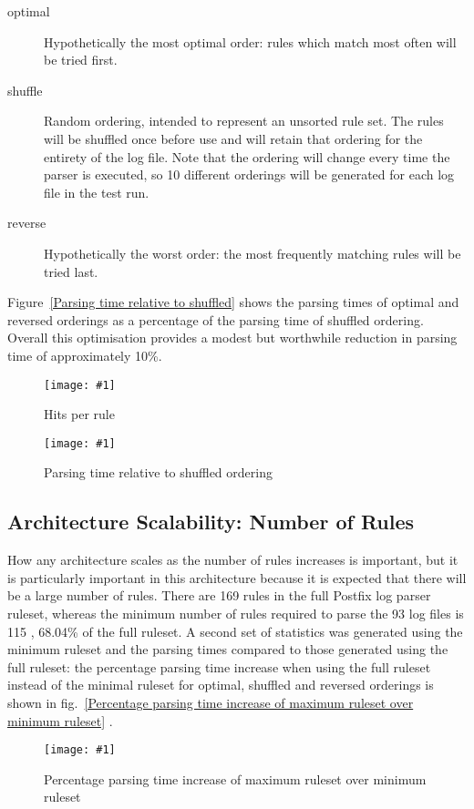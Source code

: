 \documentclass[draft]{svmult}
\newcommand{\showgraph}[3]{%
    \begin{figure}[btp]%
        \caption{#2}\label{#3}%
        \texttt{[image: \#1]}%
    \end{figure}%
}
\newcommand{\refwithlabel}[2]{%
    #1~\vref{#2}%
}
\newcommand{\graphref}[1]{%
    \refwithlabel{fig.}{#1}%
}
\newcommand{\Graphref}[1]{%
    \refwithlabel{Figure}{#1}%
}
\newcommand{\numberOFlogFILES}[0]{%
    93%
}
\newcommand{\numberOFrules}[0]{%
    169%
}
\newcommand{\numberOFrulesMINIMUM}[0]{%
    115%
}
\newcommand{\numberOFrulesMINIMUMpercentage}[0]{%
    68.04\%%
}
\begin{document}
\begin{description}

    \item [optimal]  Hypothetically the most optimal order: rules which
        match most often will be tried first.

    \item [shuffle] Random ordering, intended to represent an unsorted rule
        set.  The rules will be shuffled once before use and will retain
        that ordering for the entirety of the log file.  Note that the
        ordering will change every time the parser is executed, so 10
        different orderings will be generated for each log file in the test
        run.

    \item [reverse] Hypothetically the worst order: the most frequently
        matching rules will be tried last.

\end{description}

\Graphref{Parsing time relative to shuffled} shows the parsing times of
optimal and reversed orderings as a percentage of the parsing time of
shuffled ordering.  Overall this optimisation provides a modest but
worthwhile reduction in parsing time of approximately 10\%.
\showgraph{build/graph-hits}{Hits per rule}{rule hits graph}
\showgraph{build/graph-optimal-and-reverse-vs-shuffle}{Parsing time
relative to shuffled ordering}{Parsing time relative to shuffled}

\subsection{Architecture Scalability: Number of Rules}

How any architecture scales as the number of rules increases is important,
but it is particularly important in this architecture because it is
expected that there will be a large number of rules.  There are
\numberOFrules{} rules in the full Postfix log parser ruleset, whereas the
minimum number of rules required to parse the \numberOFlogFILES{} log files
is \numberOFrulesMINIMUM{}, \numberOFrulesMINIMUMpercentage{} of the full
ruleset.  A second set of statistics was generated using the minimum
ruleset and the parsing times compared to those generated using the full
ruleset: the percentage parsing time increase when using the full ruleset
instead of the minimal ruleset for optimal, shuffled and reversed orderings
is shown in \graphref{Percentage parsing time increase of maximum ruleset
over minimum ruleset}.
\showgraph{build/graph-full-ruleset-vs-minimum-ruleset}{Percentage parsing
time increase of maximum ruleset over minimum ruleset}{Percentage parsing
time increase of maximum ruleset over minimum ruleset}
\end{document}
